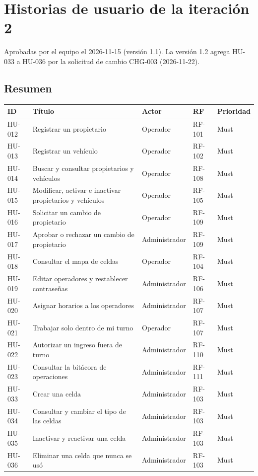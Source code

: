 \section{Historias de usuario de la iteración 2}
Aprobadas por el equipo el 2026-11-15 (versión 1.1). La versión 1.2 agrega HU-033 a HU-036 por la solicitud de cambio CHG-003 (2026-11-22).

\subsection{Resumen}

\begin{longtable}{>{\raggedright\arraybackslash}p{1.5cm}>{\raggedright\arraybackslash}p{7.0cm}>{\raggedright\arraybackslash}p{2.6cm}>{\raggedright\arraybackslash}p{1.5cm}>{\raggedright\arraybackslash}p{1.8cm}}
\toprule
\textbf{ID} & \textbf{Título} & \textbf{Actor} & \textbf{RF} & \textbf{Prioridad}\\
\midrule\endhead
HU-012 & Registrar un propietario & Operador & RF-101 & Must\\
HU-013 & Registrar un vehículo & Operador & RF-102 & Must\\
HU-014 & Buscar y consultar propietarios y vehículos & Operador & RF-108 & Must\\
HU-015 & Modificar, activar e inactivar propietarios y vehículos & Operador & RF-105 & Must\\
HU-016 & Solicitar un cambio de propietario & Operador & RF-109 & Must\\
HU-017 & Aprobar o rechazar un cambio de propietario & Administrador & RF-109 & Must\\
HU-018 & Consultar el mapa de celdas & Operador & RF-104 & Must\\
HU-019 & Editar operadores y restablecer contraseñas & Administrador & RF-106 & Must\\
HU-020 & Asignar horarios a los operadores & Administrador & RF-107 & Must\\
HU-021 & Trabajar solo dentro de mi turno & Operador & RF-107 & Must\\
HU-022 & Autorizar un ingreso fuera de turno & Administrador & RF-110 & Must\\
HU-023 & Consultar la bitácora de operaciones & Administrador & RF-111 & Must\\
HU-033 & Crear una celda & Administrador & RF-103 & Must\\
HU-034 & Consultar y cambiar el tipo de las celdas & Administrador & RF-103 & Must\\
HU-035 & Inactivar y reactivar una celda & Administrador & RF-103 & Must\\
HU-036 & Eliminar una celda que nunca se usó & Administrador & RF-103 & Must\\
\bottomrule
\end{longtable}





